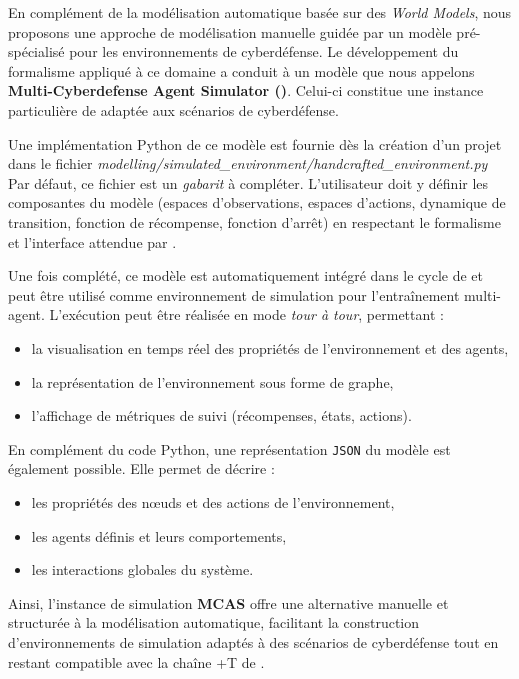 En complément de la modélisation automatique basée sur des \textit{World Models}, nous proposons une approche de modélisation manuelle guidée par un modèle pré-spécialisé pour les environnements de cyberdéfense.
Le développement du formalisme  appliqué à ce domaine a conduit à un modèle que nous appelons \textbf{Multi-Cyberdefense Agent Simulator ()}. Celui-ci constitue une instance particulière de  adaptée aux scénarios de cyberdéfense.

Une implémentation Python de ce modèle est fournie dès la création d’un projet dans le fichier
\textit{modelling/simulated\_environment/handcrafted\_environment.py}
Par défaut, ce fichier est un \textit{gabarit} à compléter. L’utilisateur doit y définir les composantes du modèle (espaces d’observations, espaces d’actions, dynamique de transition, fonction de récompense, fonction d’arrêt) en respectant le formalisme  et l’interface attendue par .


Une fois complété, ce modèle est automatiquement intégré dans le cycle de  et peut être utilisé comme environnement de simulation pour l’entraînement multi-agent. L’exécution peut être réalisée en mode \textit{tour à tour}, permettant :
\begin{itemize}
    \item la visualisation en temps réel des propriétés de l’environnement et des agents,
    \item la représentation de l’environnement sous forme de graphe,
    \item l’affichage de métriques de suivi (récompenses, états, actions).
\end{itemize}
En complément du code Python, une représentation \texttt{JSON} du modèle est également possible. Elle permet de décrire :
\begin{itemize}
    \item les propriétés des nœuds et des actions de l’environnement,
    \item les agents définis et leurs comportements,
    \item les interactions globales du système.
\end{itemize}

\medskip
Ainsi, l'instance de simulation \textbf{MCAS} offre une alternative manuelle et structurée à la modélisation automatique, facilitant la construction d’environnements de simulation adaptés à des scénarios de cyberdéfense tout en restant compatible avec la chaîne +T de .


